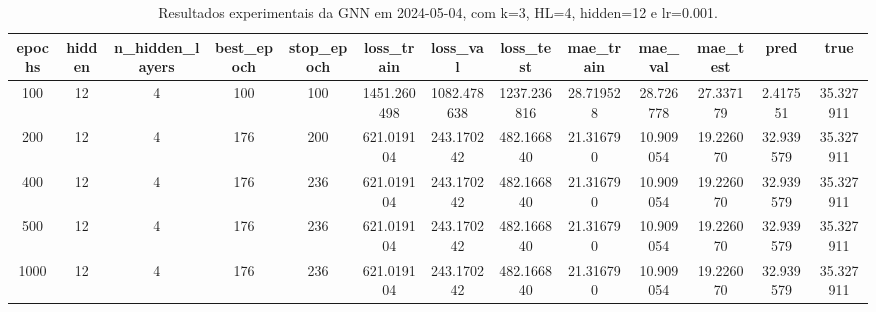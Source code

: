 \begin{table}[h]
\centering
\caption{Resultados experimentais da GNN em 2024-05-04, com k=3, HL=4, hidden=12 e lr=0.001.}
\label{tab:gnn_results_k3_hl4_h12_d20240504}
\begin{tabular}{ccccccccccccc}
\toprule
epochs & hidden & n\_hidden\_layers & best\_epoch & stop\_epoch & loss\_train & loss\_val & loss\_test & mae\_train & mae\_val & mae\_test & pred & true \\
\midrule
100 & 12 & 4 & 100 & 100 & 1451.260498 & 1082.478638 & 1237.236816 & 28.719528 & 28.726778 & 27.337179 & 2.417551 & 35.327911 \\
200 & 12 & 4 & 176 & 200 & 621.019104 & 243.170242 & 482.166840 & 21.316790 & 10.909054 & 19.226070 & 32.939579 & 35.327911 \\
400 & 12 & 4 & 176 & 236 & 621.019104 & 243.170242 & 482.166840 & 21.316790 & 10.909054 & 19.226070 & 32.939579 & 35.327911 \\
500 & 12 & 4 & 176 & 236 & 621.019104 & 243.170242 & 482.166840 & 21.316790 & 10.909054 & 19.226070 & 32.939579 & 35.327911 \\
1000 & 12 & 4 & 176 & 236 & 621.019104 & 243.170242 & 482.166840 & 21.316790 & 10.909054 & 19.226070 & 32.939579 & 35.327911 \\
\bottomrule
\end{tabular}
\end{table}
